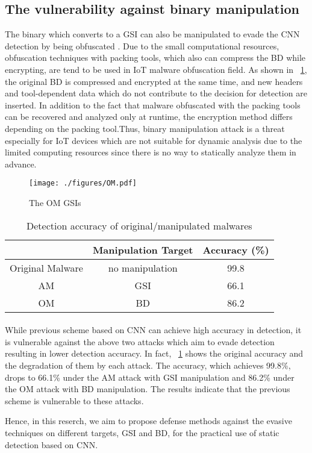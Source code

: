 \subsection{The vulnerability against binary manipulation}
The binary which converts to a GSI can also be manipulated to evade the CNN detection by being obfuscated \cite{om}.
Due to the small computational resources, obfuscation techniques with packing tools, which also can compress the BD while encrypting, are tend to be used in IoT malware obfuscation field.
As shown in \figurename~\ref{fig:omGSI}, the original BD is compressed and encrypted at the same time, and new headers and tool-dependent data which do not contribute to the decision for detection are inserted.
In addition to the fact that malware obfuscated with the packing tools can be recovered and analyzed only at runtime, the encryption method differs depending on the packing tool.Thus, binary manipulation attack is a threat especially for IoT devices which are not suitable for dynamic analysis due to the limited computing resources since there is no way to statically analyze them in advance.

\begin{figure}[p]
 \centering
 \hspace{-55pt}
 \texttt{[image: ./figures/OM.pdf]}
 \caption{The OM GSIs} 
 \label{fig:omGSI}
\end{figure}
\begin{table}[p]
  \begin{center}
    \caption{Detection accuracy of original/manipulated malwares}
    \label{tab:prev} 
    \begin{tabular}{|c|c|c|} \hline
       & Manipulation Target & Accuracy (\%) \\ \hline \hline
      Original Malware & no manipulation  & 99.8  \\ \hline
      AM & GSI & 66.1  \\ \hline 
      OM & BD & 86.2 \\ \hline
    \end{tabular}
  \end{center}
\end{table} 
\afterpage{\clearpage}
\newpage

\paragraph*{}
While previous scheme based on CNN can achieve high accuracy in detection, it is vulnerable against the above two attacks which aim to evade detection resulting in lower detection accuracy.
In fact, \tablename~\ref{tab:prev} shows the original accuracy and the degradation of them by each attack.
The accuracy, which achieves 99.8\%, drops to 66.1\% under the AM attack with GSI manipulation and 86.2\% under the OM attack with BD manipulation.
The results indicate that the previous scheme is vulnerable to these attacks.

Hence, in this reserch, we aim to propose defense methods against the evasive techniques on different targets, GSI and BD, for the practical use of static detection based on CNN.

\newpage
